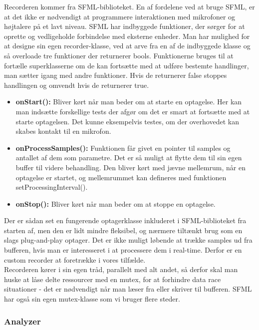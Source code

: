 Recorderen kommer fra SFML-biblioteket. En af fordelene ved at bruge SFML, er at det ikke er nødvendigt at programmere interaktionen med mikrofoner og højtalere på et lavt niveau. SFML har indbyggede funktioner, der sørger for at oprette og vedligeholde forbindelse med eksterne enheder. Man har mulighed for at designe sin egen recorder-klasse, ved at arve fra en af de indbyggede klasse og så overloade tre funktioner der returnerer bools. Funktionerne bruges til at fortælle superklasserne om de kan fortsætte med at udføre bestemte handlinger, man sætter igang med andre funktioner. Hvis de returnerer false stoppes handlingen og omvendt hvis de returnerer true.

\begin{itemize}

\item \textbf{onStart():} Bliver kørt når man beder om at starte en optagelse. Her kan man indsætte forskellige tests der afgør om det er smart at fortsætte med at starte optagelsen. Det kunne eksempelvis testes, om der overhovedet kan skabes kontakt til en mikrofon.

\item \textbf{onProcessSamples():} Funktionen får givet en pointer til samples og antallet af dem som parametre. Det er så muligt at flytte dem til sin egen buffer til videre behandling. Den bliver kørt med jævne mellemrum, når en optagelse er startet, og mellemrummet kan defineres med funktionen setProcessingInterval(). 

\item \textbf{onStop():} Bliver kørt når man beder om at stoppe en optagelse.

\end{itemize}

Der er sådan set en fungerende optagerklasse inkluderet i SFML-biblioteket fra starten af, men den er lidt mindre fleksibel, og nærmere tiltænkt brug som en slags plug-and-play optager. Det er ikke muligt løbende at trække samples ud fra bufferen, hvis man er interesseret i at processere dem i real-time. Derfor er en custom recorder at foretrække i vores tilfælde. \\
Recorderen kører i sin egen tråd, parallelt med alt andet, så derfor skal man huske at låse delte ressourcer med en mutex, for at forhindre data race situationer - det er nødvendigt når man læser fra eller skriver til bufferen. SFML har også sin egen mutex-klasse som vi bruger flere steder.

\subsubsection{Analyzer}

